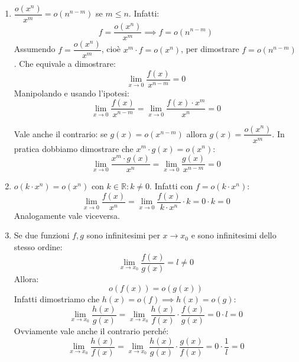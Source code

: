 \begin{enumerate}
	\item $\dfrac{o(x^n)}{x^m} = o(n^{n-m})$ se $m \leq n$. Infatti:
		\begin{equation*}
			f = \dfrac{o(x^n)}{x^m} \implies f = o(n^{n-m})
		\end{equation*}
		Assumendo $f = \dfrac{o(x^n)}{x^m}$, cioè $x^m \cdot f = o(x^n)$, per 
        dimostrare $f = o(n^{n-m})$. Che equivale a dimostrare:
		\begin{equation*}
			\lim_{x \to 0} \dfrac{f(x)}{x^{n-m}} = 0
		\end{equation*}
		Manipolando e usando l'ipotesi:
		\begin{equation*}
			\lim_{x \to 0} \dfrac{f(x)}{x^{n-m}} = \lim_{x \to 0} \dfrac{f(x) 
            \cdot x^m}{x^n} = 0
		\end{equation*}

		Vale anche il contrario: se $g(x) = o(x^{n-m})$ allora $g(x) = 
        \dfrac{o(x^n)}{x^m}$. In pratica dobbiamo dimostrare che $x^m \cdot 
        g(x) = o(x^n)$:
		\begin{equation*}
			\lim_{x \to 0} \dfrac {x^m \cdot g(x)}{x^n} = \lim_{x \to 0} 
            \dfrac{g(x)}{x^{n-m}} = 0
		\end{equation*}

	\item $o(k \cdot x^n) = o(x^n)$ con $k \in \mathbb{R}: k \neq 0$. Infatti 
        con $f=o(k\cdot x^n)$:
		\begin{equation*}
			\lim_{x \to 0} \dfrac{f(x)}{x^n} = \lim_{x \to 0} \dfrac{f(x)}
            {k \cdot x^n} \cdot k = 0 \cdot k = 0
		\end{equation*}
		Analogamente vale viceversa.

	\item Se due funzioni $f,g$ sono infinitesimi per $x \to x_0$ e sono 
        infinitesimi dello stesso ordine:
		\begin{equation*}
			\lim_{x \to x_0} \dfrac{f(x)}{g(x)} = l \neq 0
		\end{equation*}
		Allora:
		\begin{equation*}
			o(f(x)) = o(g(x))
		\end{equation*}
		Infatti dimostriamo che $h(x) = o(f) \implies h(x) = o(g)$:
		\begin{equation*}
			\lim_{x \to x_0} \dfrac{h(x)}{g(x)} = \lim_{x \to x_0} \dfrac{h(x)}
            {f(x)} \cdot \dfrac{f(x)}{g(x)} = 0 \cdot l = 0
		\end{equation*}
		Ovviamente vale anche il contrario perché:
		\begin{equation*}
			\lim_{x \to x_0} \dfrac{h(x)}{f(x)} = \lim_{x \to x_0} \dfrac{h(x)}
            {g(x)} \cdot \dfrac{g(x)}{f(x)} = 0 \cdot \dfrac{1}{l} = 0
		\end{equation*}


\end{enumerate}
